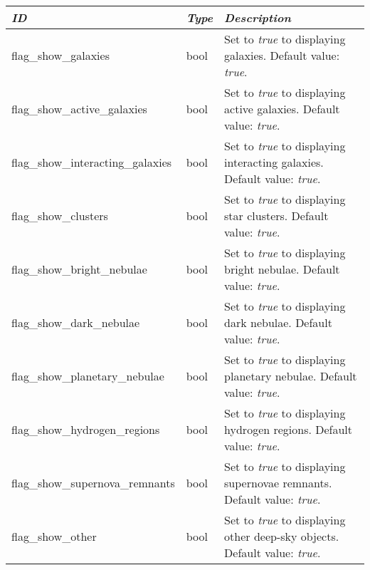 \section{}
\label{section-dsoux5ftypeux5ffilters}

\begin{longtabu} to \textwidth {l|l|X}
\toprule
\emph{ID} & \emph{Type} & \emph{Description}\tabularnewline
\midrule
flag\_show\_galaxies & bool & Set to \emph{true}
to displaying galaxies. Default value: \emph{true}. \tabularnewline
\midrule
flag\_show\_active\_galaxies & bool & Set to
\emph{true} to displaying active galaxies. Default value: \emph{true}. \tabularnewline
\midrule
flag\_show\_interacting\_galaxies & bool & Set
to \emph{true} to displaying interacting galaxies. Default value: \emph{true}. \tabularnewline
\midrule
flag\_show\_clusters & bool & Set to \emph{true}
to displaying star clusters. Default value: \emph{true}. \tabularnewline
\midrule
flag\_show\_bright\_nebulae & bool & Set to
\emph{true} to displaying bright nebulae. Default value: \emph{true}. \tabularnewline
\midrule
flag\_show\_dark\_nebulae & bool & Set to
\emph{true} to displaying dark nebulae. Default value: \emph{true}. \tabularnewline
\midrule
flag\_show\_planetary\_nebulae & bool & Set to
\emph{true} to displaying planetary nebulae. Default value: \emph{true}. \tabularnewline
\midrule
flag\_show\_hydrogen\_regions & bool & Set to
\emph{true} to displaying hydrogen regions. Default value: \emph{true}. \tabularnewline
\midrule
flag\_show\_supernova\_remnants & bool & Set to
\emph{true} to displaying supernovae remnants. Default value: \emph{true}. \tabularnewline
\midrule
flag\_show\_other & bool & Set to \emph{true} to
displaying other deep-sky objects. Default value: \emph{true}. \tabularnewline
\bottomrule
\end{longtabu}

\section{}\label{section-gui}

